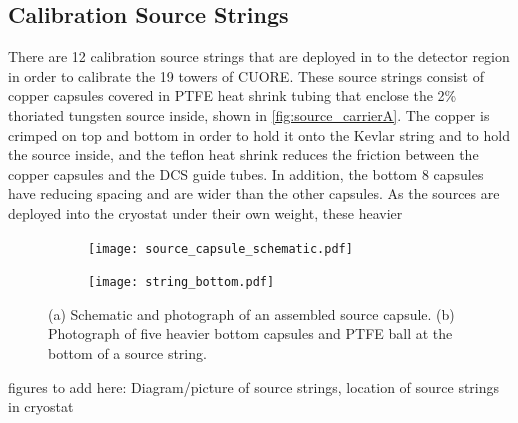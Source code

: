 \subsection{Calibration Source Strings}
There are 12 calibration source strings that are deployed in to the detector region in order to calibrate the 19 towers of CUORE. These source strings consist of copper capsules covered in PTFE heat shrink tubing that enclose the 2\% thoriated tungsten source inside, shown in \autoref{fig:source_carrierA}. The copper is crimped on top and bottom in order to hold it onto the Kevlar string and to hold the source inside, and the teflon heat shrink reduces the friction between the copper capsules and the DCS guide tubes. In addition, the bottom 8 capsules have reducing spacing and are wider than the other capsules. As the sources are deployed into the cryostat under their own weight, these heavier 

\begin{figure}[htpb]
\begin{center}
\begin{subfigure}[b]{0.60\textwidth}
\texttt{[image: source\_capsule\_schematic.pdf]}\label{fig:source_carrierA}
\caption{}
\end{subfigure}
\begin{subfigure}[b]{0.15\textwidth}
\texttt{[image: string\_bottom.pdf]}\label{fig:source_carrierB}
\caption{}
\end{subfigure}
\end{center}
\caption[(a) Schematic and photograph of an assembled source capsule. (b) Photograph of five heavier bottom capsules and PTFE ball at the bottom of a source string.]{(a) Schematic and photograph of an assembled source capsule. (b) Photograph of five heavier bottom capsules and PTFE ball at the bottom of a source string.}
\label{fig:source_carrier}
\end{figure}
 

figures to add here: Diagram/picture of source strings, location of source strings in cryostat
